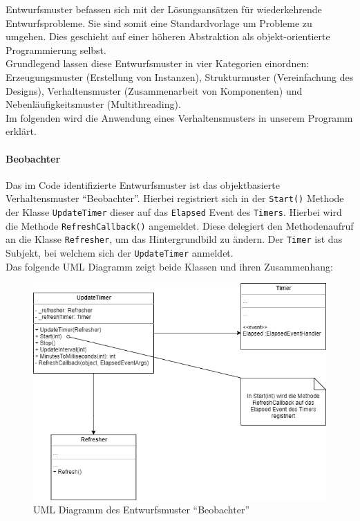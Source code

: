 Entwurfsmuster befassen sich mit der Lösungsansätzen für wiederkehrende Entwurfsprobleme.
Sie sind somit eine Standardvorlage um Probleme zu umgehen.
Dies geschieht auf einer höheren Abstraktion als objekt-orientierte Programmierung selbst.\\
Grundlegend lassen diese Entwurfsmuster in vier Kategorien einordnen: Erzeugungsmuster (Erstellung von Instanzen), Strukturmuster (Vereinfachung des Designs), Verhaltensmuster (Zusammenarbeit von Komponenten) und Nebenläufigkeitsmuster (Multithreading).\\

\noindent Im folgenden wird die Anwendung eines Verhaltensmusters in unserem Programm erklärt.

\paragraph{Beobachter}
Das im Code identifizierte Entwurfsmuster ist das objektbasierte Verhaltensmuster \enquote{Beobachter}.
Hierbei registriert sich in der \texttt{Start()} Methode der Klasse \texttt{UpdateTimer} dieser auf das \texttt{Elapsed} Event des \texttt{Timers}.
Hierbei wird die Methode \texttt{RefreshCallback()} angemeldet.
Diese delegiert den Methodenaufruf an die Klasse \texttt{Refresher}, um das Hintergrundbild zu ändern.
Der \texttt{Timer} ist das Subjekt, bei welchem sich der \texttt{UpdateTimer} anmeldet.\\

\noindent Das folgende UML Diagramm zeigt beide Klassen und ihren Zusammenhang:

\medspace
\begin{figure}[h]
	\begin{center}
		\includegraphics[width=\linewidth]{Bilder/Beobachter_UML.png}
	\end{center}
	\caption{UML Diagramm des Entwurfsmuster \enquote{Beobachter}}
\end{figure}